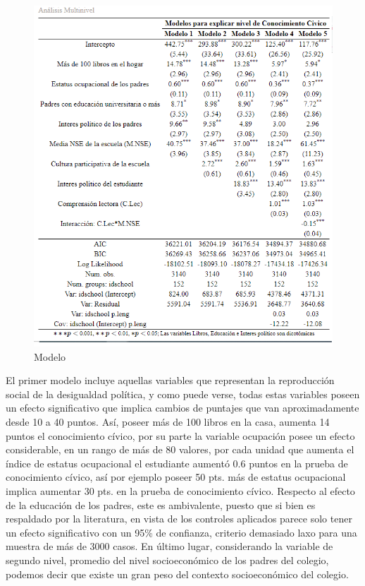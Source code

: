 \documentclass[12pt,twoside]{templates/facsothesis}
\begin{document}
\begin{figure}

{\centering \includegraphics[width=0.8\linewidth]{images/regmultinivel} 

}

\caption{Modelo}\label{fig:unnamed-chunk-12}
\end{figure}

El primer modelo incluye aquellas variables que representan la reproducción social de la desigualdad política, y como puede verse, todas estas variables poseen un efecto significativo que implica cambios de puntajes que van aproximadamente desde 10 a 40 puntos. Así, poseer más de 100 libros en la casa, aumenta 14 puntos el conocimiento cívico, por su parte la variable ocupación posee un efecto considerable, en un rango de más de 80 valores, por cada unidad que aumenta el índice de estatus ocupacional el estudiante aumentó 0.6 puntos en la prueba de conocimiento cívico, así por ejemplo poseer 50 pts. más de estatus ocupacional implica aumentar 30 pts. en la prueba de conocimiento cívico. Respecto al efecto de la educación de los padres, este es ambivalente, puesto que si bien es respaldado por la literatura, en vista de los controles aplicados parece solo tener un efecto significativo con un 95\% de confianza, criterio demasiado laxo para una muestra de más de 3000 casos. En último lugar, considerando la variable de segundo nivel, promedio del nivel socioeconómico de los padres del colegio, podemos decir que existe un gran peso del contexto socioeconómico del colegio.
\end{document}
